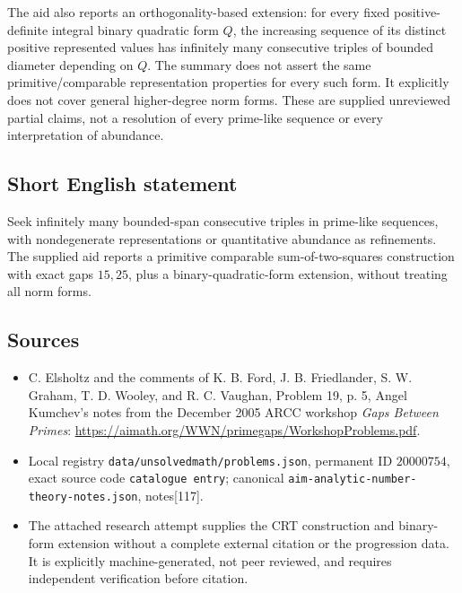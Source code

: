\documentclass[11pt]{article}
\begin{document}
The aid also reports an orthogonality-based extension: for every fixed positive-definite integral binary quadratic form \(Q\), the increasing sequence of its distinct positive represented values has infinitely many consecutive triples of bounded diameter depending on \(Q\). The summary does not assert the same primitive/comparable representation properties for every such form. It explicitly does not cover general higher-degree norm forms. These are supplied unreviewed partial claims, not a resolution of every prime-like sequence or every interpretation of abundance.
\subsection{Short English statement}
Seek infinitely many bounded-span consecutive triples in prime-like sequences, with nondegenerate representations or quantitative abundance as refinements. The supplied aid reports a primitive comparable sum-of-two-squares construction with exact gaps \(15,25\), plus a binary-quadratic-form extension, without treating all norm forms.
\subsection{Sources}
\begin{itemize}
\item C. Elsholtz and the comments of K. B. Ford, J. B. Friedlander, S. W. Graham, T. D. Wooley, and R. C. Vaughan, Problem 19, p. 5, Angel Kumchev's notes from the December 2005 ARCC workshop \emph{Gaps Between Primes}: \url{https://aimath.org/WWN/primegaps/WorkshopProblems.pdf}.
\item Local registry \texttt{data/unsolvedmath/problems.json}, permanent ID \(20000754\), exact source code \texttt{catalogue entry}; canonical \texttt{aim-analytic-number-theory-notes.json}, notes[117].
\item The attached research attempt supplies the CRT construction and binary-form extension without a complete external citation or the progression data. It is explicitly machine-generated, not peer reviewed, and requires independent verification before citation.
\end{itemize}
\end{document}
